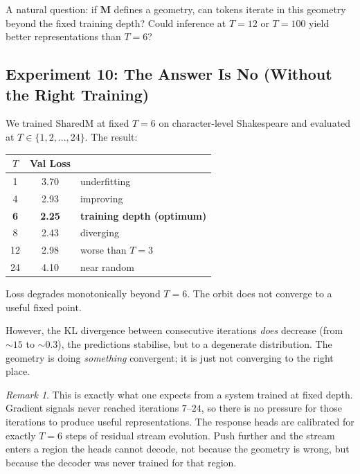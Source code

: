\documentclass[11pt, a4paper]{article}
\newcommand{\M}{\mathbf{M}}
\theoremstyle{plain}
\theoremstyle{definition}
\theoremstyle{remark}
\newtheorem*{remark}{Remark}
\begin{document}
A natural question: if $\M$ defines a geometry, can tokens iterate in this geometry beyond the fixed training depth?
Could inference at $T{=}12$ or $T{=}100$ yield better representations than $T{=}6$?

\subsection{Experiment 10: The Answer Is No (Without the Right Training)}

We trained SharedM at fixed $T{=}6$ on character-level Shakespeare and evaluated at $T \in \{1, 2, \ldots, 24\}$.
The result:

\begin{center}
\begin{tabular}{@{}ccl@{}}
\toprule
$T$ & Val Loss & \\
\midrule
1 & 3.70 & underfitting \\
4 & 2.93 & improving \\
\textbf{6} & \textbf{2.25} & \textbf{training depth (optimum)} \\
8 & 2.43 & diverging \\
12 & 2.98 & worse than $T{=}3$ \\
24 & 4.10 & near random \\
\bottomrule
\end{tabular}
\end{center}

Loss degrades monotonically beyond $T{=}6$.
The orbit does not converge to a useful fixed point.

However, the KL divergence between consecutive iterations \emph{does} decrease (from ${\sim}15$ to ${\sim}0.3$), the predictions stabilise, but to a degenerate distribution.
The geometry is doing \emph{something} convergent; it is just not converging to the right place.

\begin{remark}
This is exactly what one expects from a system trained at fixed depth.
Gradient signals never reached iterations $7$--$24$, so there is no pressure for those iterations to produce useful representations.
The response heads are calibrated for exactly $T{=}6$ steps of residual stream evolution.
Push further and the stream enters a region the heads cannot decode, not because the geometry is wrong, but because the decoder was never trained for that region.
\end{remark}

\end{document}
